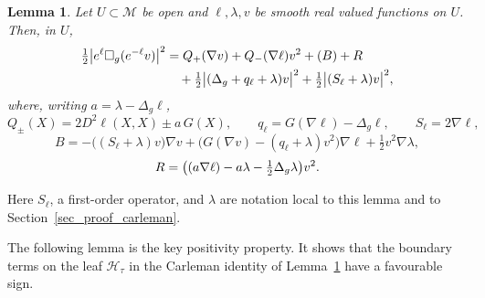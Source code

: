 \documentclass[12pt,reqno]{amsart}
\numberwithin{equation}{section}
\theoremstyle{definition}
\theoremstyle{plain}
\newtheorem{lemma}[theorem]{Lemma}
\theoremstyle{definition}
\theoremstyle{definition}
\newcommand{\M}{\mathcal{M}}
\let\div\relax
\DeclareMathOperator{\div}{div}
\let\div\relax
\DeclareMathOperator{\div}{div}
\begin{document}
\begin{lemma}\label{lem_carleman_eq}
Let $U\subset\M$ be open and $\ell, \lambda,v$ be smooth real valued functions on $U$. Then, in $U$,
\begin{align*}
\tfrac12\bigl|e^\ell\Box_g(e^{-\ell}v)\bigr|^2
&= Q_+(\nabla v) + Q_-(\nabla\ell)v^2 + \div(B) + R \\
&\quad + \tfrac12\bigl|(\Delta_g+q_\ell+\lambda)v\bigr|^2 + \tfrac12\bigl|(S_\ell+\lambda)v\bigr|^2,
\end{align*}
where, writing $a=\lambda-\Delta_g\ell$,
\[
Q_\pm(X)=2D^2\ell(X,X)\pm a\,G(X), \qquad q_\ell = G(\nabla\ell)-\Delta_g\ell, \qquad S_\ell = 2\nabla\ell,
\]
\[
B = -\bigl((S_\ell+\lambda)v\bigr)\nabla v + \bigl(G(\nabla v)-(q_\ell+\lambda)v^2\bigr)\nabla\ell + \tfrac12 v^2\nabla\lambda,
\]
\[
R = \bigl(\div(a\nabla\ell) - a\lambda - \tfrac12\Delta_g\lambda\bigr)v^2.
\]
\end{lemma}
Here $S_\ell$, a first-order operator, and $\lambda$ are notation local to this lemma and to Section~\ref{sec_proof_carleman}.

\medskip

The following lemma is the key positivity property. It shows that the boundary terms on the leaf $\mathcal H_\tau$ in the Carleman identity of Lemma~\ref{lem_carleman_eq} have a favourable sign.
\end{document}
